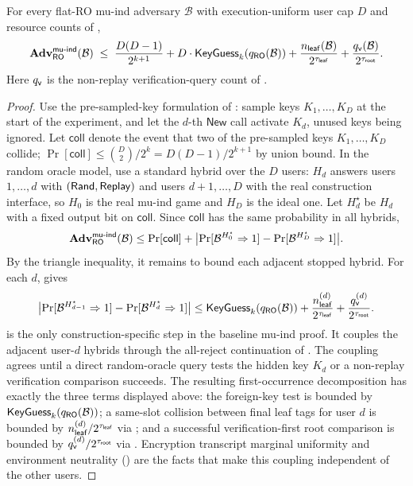 \begin{theorem}
\label{thm:mu-ind-ro}
For every flat-RO mu-ind adversary $\mathcal{B}$ with
execution-uniform user cap $D$ and resource counts of
,
\[
  \mathbf{Adv}^{\mathsf{mu\text{-}ind}}_{\mathsf{RO}}(\mathcal{B})
  \;\leq\;
  \frac{D(D - 1)}{2^{k + 1}}
  + D \cdot \mathsf{KeyGuess}_k(q_{\mathsf{RO}}(\mathcal{B}))
  + \frac{n_{\mathsf{leaf}}(\mathcal{B})}{2^{\tau_{\mathsf{leaf}}}}
  + \frac{q_{\mathsf{v}}(\mathcal{B})}{2^{\tau_{\mathsf{root}}}}.
\]
Here $q_{\mathsf{v}}$ is the non-replay verification-query count of
.
\end{theorem}

\begin{proof}
Use the pre-sampled-key formulation of : sample
keys $K_1,\dots,K_D$ at the start of the experiment, and let the $d$-th
$\mathsf{New}$ call activate $K_d$, unused keys being ignored.
Let $\mathsf{coll}$ denote the event that two of the pre-sampled keys
$K_1,\dots,K_D$ collide;
$\Pr[\mathsf{coll}] \leq \binom{D}{2}/2^k = D(D-1)/2^{k+1}$ by union
bound. In the random oracle model, use a standard hybrid over the $D$
users: $H_d$ answers users $1,\dots,d$ with $(\mathsf{Rand},\mathsf{Replay})$ and
users $d+1,\dots,D$ with the real construction interface, so $H_0$ is
the real mu-ind game and $H_D$ is the ideal one. Let $H_d^\star$ be
$H_d$ with a fixed output bit on $\mathsf{coll}$. Since
$\mathsf{coll}$ has the same probability in all hybrids,
\[
  \mathbf{Adv}^{\mathsf{mu\text{-}ind}}_{\mathsf{RO}}(\mathcal{B})
  \leq
  \Pr[\mathsf{coll}]
  +
  \bigl|\Pr[\mathcal{B}^{H_0^\star} \Rightarrow 1]
       - \Pr[\mathcal{B}^{H_D^\star} \Rightarrow 1]\bigr|.
\]
By the triangle inequality, it remains to bound each adjacent stopped
hybrid. For each $d$,  gives
\[
  \bigl|\Pr[\mathcal{B}^{H_{d-1}^\star} \Rightarrow 1]
       - \Pr[\mathcal{B}^{H_d^\star} \Rightarrow 1]\bigr|
  \leq
  \mathsf{KeyGuess}_k(q_{\mathsf{RO}}(\mathcal{B}))
  + \frac{n_{\mathsf{leaf}}^{(d)}}{2^{\tau_{\mathsf{leaf}}}}
  + \frac{q_{\mathsf{v}}^{(d)}}{2^{\tau_{\mathsf{root}}}}.
\]
 is the only construction-specific step in
the baseline mu-ind proof. It couples the adjacent user-$d$ hybrids through
the all-reject continuation of . The
coupling agrees until a direct random-oracle query tests the hidden key
$K_d$ or a non-replay verification comparison succeeds. The resulting
first-occurrence decomposition has exactly the three terms displayed above:
the foreign-key test is bounded by
$\mathsf{KeyGuess}_k(q_{\mathsf{RO}}(\mathcal{B}))$; a same-slot collision between final leaf
tags for user $d$ is bounded by
$n_{\mathsf{leaf}}^{(d)}/2^{\tau_{\mathsf{leaf}}}$ via ; and a successful
verification-first root comparison is bounded by
$q_{\mathsf{v}}^{(d)}/2^{\tau_{\mathsf{root}}}$ via . Encryption
transcript marginal uniformity and environment neutrality
() are the
facts that make this coupling independent of the other users.


\end{proof}
